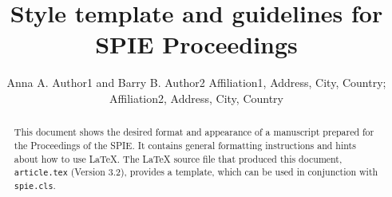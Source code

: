 \title{Style template and guidelines for SPIE Proceedings} 


\author{Anna A. Author1 and Barry B. Author2
\skiplinehalf
{}Affiliation1, Address, City, Country; \\
Affiliation2, Address, City, Country
}



\maketitle 

\begin{abstract}
This document shows the desired format and appearance of a manuscript prepared for the Proceedings of the SPIE.  It contains general formatting instructions and hints about how to use LaTeX.  The LaTeX source file that produced this document, {\tt article.tex} (Version 3.2), provides a template, which can be used in conjunction with {\tt spie.cls}.  
\end{abstract}


